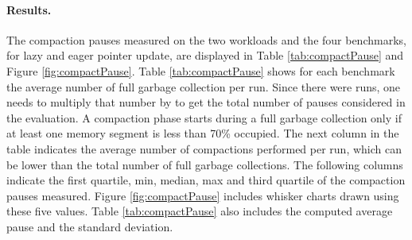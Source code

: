 \documentclass[sigplan,10pt,review,anonymous]{acmart}\settopmatter{printfolios=true,printccs=false,printacmref=false}
\begin{document}

\paragraph{Results.} 
The compaction pauses measured on the two workloads and the four benchmarks, for lazy and eager pointer update, are displayed in Table \ref{tab:compactPause} and Figure \ref{fig:compactPause}. 
Table  \ref{tab:compactPause} shows for each benchmark the average number of full garbage collection per run. Since there were \numRuns runs, one needs to multiply that number by \numRuns to get the total number of pauses considered in the evaluation. A compaction phase starts during a full garbage collection only if at least one memory segment is less than 70\% occupied. The next column in the table indicates the average number of compactions performed per run, which can be lower than the total number of full garbage collections. The following columns indicate the first quartile, min, median, max and third quartile of the compaction pauses measured.  Figure \ref{fig:compactPause} includes whisker charts drawn using these five values. Table \ref{tab:compactPause} also includes the computed average pause and the standard deviation.%
\end{document}
